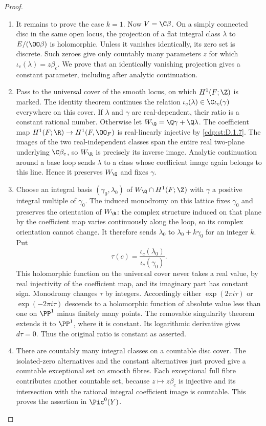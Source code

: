 \begin{proof}
\begin{enumerate}[label={$\langle1\rangle$\arabic*.},leftmargin=*]
\item It remains to prove the case $k=1$.
Now $V=\C\beta$. On a simply connected disc in the same open locus,
the projection of a flat integral class $\lambda$ to
$E/(\OO\beta)$ is holomorphic. Unless it vanishes identically,
its zero set is discrete. Such zeroes give only countably many
parameters $z$ for which $\iota_c(\lambda)=z\beta_c$.
We prove that an identically vanishing projection gives a constant
parameter, including after analytic continuation.

\item Pass to the universal cover of the smooth locus, on which
$H^1(F;\Z)$ is marked. The identity theorem continues the relation
$\iota_c(\lambda)\in\C\iota_c(\gamma)$ everywhere on this cover.
If $\lambda$ and $\gamma$ are real-dependent, their ratio is a
constant rational number. Otherwise let
$W_{\Q}=\Q\gamma+\Q\lambda$. The coefficient map
$H^1(F;\R)\to H^1(F,\OO_F)$ is real-linearly injective by \ref{cdp:st:D.1.7}.
The images of the two real-independent classes span the entire
real two-plane underlying $\C\beta_c$, so $W_{\R}$ is precisely
its inverse image. Analytic continuation around a base loop
sends $\lambda$ to a class whose coefficient image again belongs
to this line. Hence it preserves $W_{\Q}$ and fixes $\gamma$.

\item Choose an integral basis $(\gamma_0,\lambda_0)$ of
$W_{\Q}\cap H^1(F;\Z)$ with $\gamma$ a positive integral multiple
of $\gamma_0$. The induced monodromy on this lattice fixes
$\gamma_0$ and preserves the orientation of $W_{\R}$: the complex
structure induced on that plane by the coefficient map varies
continuously along the loop, so its complex orientation cannot change.
It therefore sends $\lambda_0$ to $\lambda_0+k\gamma_0$ for an
integer $k$. Put
\[
\tau(c)=\frac{\iota_c(\lambda_0)}{\iota_c(\gamma_0)}.
\]
This holomorphic function on the universal cover never takes a
real value, by real injectivity of the coefficient map, and its
imaginary part has constant sign. Monodromy changes $\tau$ by
integers. Accordingly either $\exp(2\pi i\tau)$ or
$\exp(-2\pi i\tau)$ descends to a holomorphic function of absolute
value less than one on $\PP^1$ minus finitely many points. The
removable singularity theorem extends it to $\PP^1$, where it is
constant. Its logarithmic derivative gives $d\tau=0$. Thus the
original ratio is constant as asserted.

\item There are countably many integral classes on a countable disc
cover. The isolated-zero alternatives and the constant alternatives
just proved give a countable exceptional set on smooth fibres.
Each exceptional full fibre contributes another countable set,
because $z\mapsto z\beta_c$ is injective and its intersection with
the rational integral coefficient image is countable. This proves
the assertion in $\Pic^0(Y)$.


\end{enumerate}
\end{proof}
